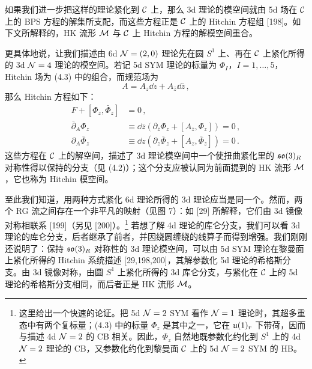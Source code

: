如果我们进一步把这样的理论紧化到 $\mathcal{C}$ 上，那么 3d 理论的模空间就由 5d 场在 $\mathcal{C}$ 上的 BPS 方程的解集所支配，而这些方程正是 $\mathcal{C}$ 上的 Hitchin 方程组 [198]。如下文所解释的，HK 流形 $\mathcal{M}$ 与 $\mathcal{C}$ 上 Hitchin 方程的解模空间重合。

更具体地说，让我们描述由 6d $\mathcal{N}=(2,0)$ 理论先在圆 $S^1$ 上、再在 $\mathcal{C}$ 上紧化所得的 3d $\mathcal{N}=4$ 理论的模空间。若记 5d SYM 理论的标量为 $\Phi_I$，$I=1,\ldots,5$，Hitchin 场为 (4.3) 中的组合，而规范场为
\begin{equation}
  A = A_z\dd z + A_{\bar z}\dd\bar z\,,
  \tag{4.6}
\end{equation}
那么 Hitchin 方程如下：
\begin{equation}
\begin{aligned}
  F + [\Phi_z,\bar\Phi_z] &= 0\,,\\
  \bar\partial_A\Phi_z &\equiv \dd\bar z\left(\partial_{\bar z}\Phi_z+[A_{\bar z},\Phi_z]\right) = 0\,,\\
  \partial_A\bar\Phi_z &\equiv \dd z\left(\partial_z\bar\Phi_z+[A_z,\bar\Phi_z]\right) = 0\,.
\end{aligned}
\tag{4.7}
\end{equation}
这些方程在 $\mathcal{C}$ 上的解空间，描述了 3d 理论模空间中一个使扭曲紧化里的 $\mathfrak{so}(3)_R$ 对称性得以保持的分支（见 (4.2)）；这个分支应被认同为前面提到的 HK 流形 $\mathcal{M}$，它也称为 Hitchin 模空间。

至此我们知道，用两种方式紧化 6d 理论所得的 3d 理论应当是同一个。然而，两个 RG 流之间存在一个非平凡的映射（见图 7）：如 [29] 所解释，它们由 3d 镜像对称相联系 [199]（另见 [200]）。\footnote{这里给出一个快速的论证。把 5d $\mathcal{N}=2$ SYM 看作 $\mathcal{N}=1$ 理论时，其超多重态中有两个复标量；(4.3) 中的标量 $\Phi_z$ 是其中之一，它在 $\mathfrak{u}(1)_r$ 下带荷，因而与描述 4d $\mathcal{N}=2$ 的 CB 相关。因此，$\Phi_z$ 自然地既参数化约化到 $S^1$ 上的 4d $\mathcal{N}=2$ 理论的 CB，又参数化约化到黎曼面 $\mathcal{C}$ 上的 5d $\mathcal{N}=2$ SYM 的 HB。} 若想了解 4d 理论的库仑分支，我们可以看 3d 理论的库仑分支，后者继承了前者，并因绕圆缠绕的线算子而得到增强。我们刚刚还说明了：保持 $\mathfrak{so}(3)_R$ 对称性的 3d 理论模空间，可以由 5d SYM 理论在黎曼面上紧化所得的 Hitchin 系统描述 [29,198,200]，其解参数化 5d 理论的希格斯分支。由 3d 镜像对称，由圆 $S^1$ 上紧化所得的 3d 库仑分支，与紧化在 $\mathcal{C}$ 上的 5d 理论的希格斯分支相同，而后者正是 HK 流形 $\mathcal{M}$。

